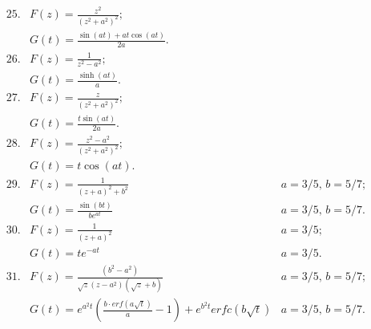 \documentclass[10pt]{article}
\begin{document}
\[
\begin{array}{llr}
25. & F(z)= \frac{z^{2}}{(z^{2}+a^{2})^{2}}; &  \\[1cm]
  & G(t)= \frac{\sin(at)+at\cos(at)}{2a}. &\\[1cm]
26. & F(z)= \frac{1}{z^{2}-a^{2}}; &  \\[1cm]
  & G(t)= \frac{\sinh(at)}{a}. & \\[1cm]
27. & F(z)= \frac{z}{(z^{2}+a^{2})^{2}}; &  \\[1cm]
  & G(t)= \frac{t\sin(at)}{2a}. &\\[1cm]
28. & F(z)= \frac{z^{2}-a^{2}}{(z^{2}+a^{2})^{2}}; &  \\[1cm]
  & G(t)= t\cos(at). &\\[1cm]
29. & F(z)= \frac{1}{(z+a)^{2}+b^{2}} & a=3/5, \, b=5/7; \\[1cm]
  & G(t)= \frac{\sin(bt)}{be^{at}} & a=3/5, \, b=5/7.\\[1cm]
30. & F(z)= \frac{1}{(z+a)^{2}} & a=3/5; \\[1cm]
  & G(t)= te^{-at} & a=3/5.\\[1cm]
31. & F(z)= \frac{(b^{2}-a^{2})}{\sqrt{z}(z-a^{2})(\sqrt{z}+b)} & a=3/5, \, b=5/7; \\[1cm]
  & G(t)= e^{a^{2}t}(\frac{b \cdot erf(a\sqrt{t})}{a}-1)+e^{b^{2}t}erfc(b\sqrt{t}) &a=3/5, \, b=5/7.
\end{array}
\]
\end{document}
